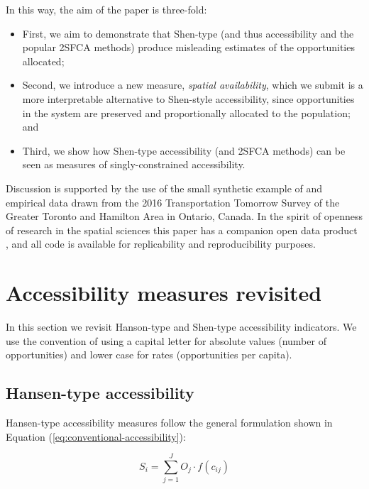 \documentclass[]{elsarticle} %
\begin{document}
In this way, the aim of the paper is three-fold:

\begin{itemize}
\item
  First, we aim to demonstrate that Shen-type (and thus
  \citet{weibull_axiomatic_1976} accessibility and the popular 2SFCA
  methods) produce misleading estimates of the opportunities allocated;
\item
  Second, we introduce a new measure, \emph{spatial availability}, which
  we submit is a more interpretable alternative to Shen-style
  accessibility, since opportunities in the system are preserved and
  proportionally allocated to the population; and
\item
  Third, we show how Shen-type accessibility (and 2SFCA methods) can be
  seen as measures of singly-constrained accessibility.
\end{itemize}

Discussion is supported by the use of the small synthetic example of
\citet{shen1998} and empirical data drawn from the 2016 Transportation
Tomorrow Survey of the Greater Toronto and Hamilton Area in Ontario,
Canada. In the spirit of openness of research in the spatial sciences
\citep{brunsdon2021opening, paez2021open} this paper has a companion
open data product \citep{arribas2021Open}, and all code is available for
replicability and reproducibility purposes.

\hypertarget{background}{%
\section{Accessibility measures revisited}\label{background}}

In this section we revisit Hanson-type and Shen-type accessibility
indicators. We use the convention of using a capital letter for absolute
values (number of opportunities) and lower case for rates (opportunities
per capita).

\hypertarget{hansen-type-accessibility}{%
\subsection{Hansen-type accessibility}\label{hansen-type-accessibility}}

Hansen-type accessibility measures follow the general formulation shown
in Equation (\ref{eq:conventional-accessibility}):

\begin{equation}
\label{eq:conventional-accessibility}
S_i = \sum_{j=1}^JO_j \cdot f(c_{ij})
\end{equation}
\end{document}
